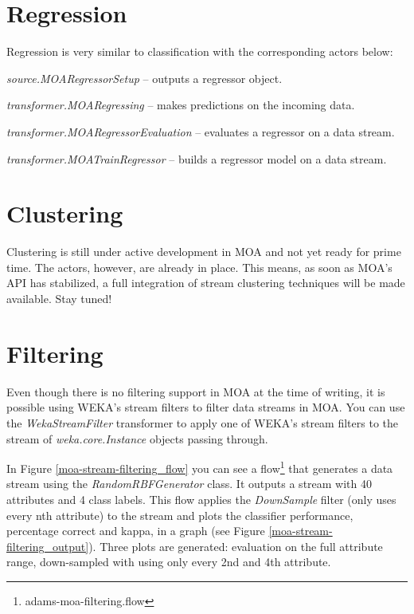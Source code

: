 \documentclass[a4paper]{book}
\begin{document}
\clearpage
\newpage
\section{Regression}
Regression is very similar to classification with the corresponding actors
below:
\begin{tight_itemize}
  \item \textit{source.MOARegressorSetup} -- outputs a regressor object.
  \item \textit{transformer.MOARegressing} -- makes predictions on the incoming data.
  \item \textit{transformer.MOARegressorEvaluation} -- evaluates a regressor on a data stream.
  \item \textit{transformer.MOATrainRegressor} -- builds a regressor model on a data stream.
\end{tight_itemize}

\clearpage
\newpage
\section{Clustering}
Clustering is still under active development in MOA and not yet ready 
for prime time. The actors, however, are already in place. This means,
as soon as MOA's API has stabilized, a full integration of stream 
clustering techniques will be made available. Stay tuned!

\clearpage
\newpage
\section{Filtering}
Even though there is no filtering support in MOA at the time of writing, it is
possible using WEKA's stream filters to filter data streams in MOA.
You can use the \textit{WekaStreamFilter} transformer to apply one of WEKA's
stream filters to the stream of \textit{weka.core.Instance} objects passing
through.

In Figure \ref{moa-stream-filtering_flow} you can see a flow\footnote{adams-moa-filtering.flow} 
that generates a data stream using the \textit{RandomRBFGenerator} class. It
outputs a stream with 40 attributes and 4 class labels. This flow applies
the \textit{DownSample} filter (only uses every nth attribute) to the stream
and plots the classifier performance, percentage correct and kappa, in a graph
(see Figure \ref{moa-stream-filtering_output}). Three plots are generated: evaluation
on the full attribute range, down-sampled with using only every 2nd and 4th
attribute.
\end{document}
